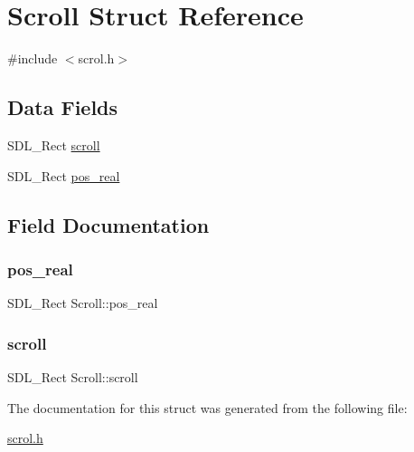 \hypertarget{structScroll}{}\section{Scroll Struct Reference}
\label{structScroll}


{\ttfamily \#include $<$scrol.\+h$>$}

\subsection*{Data Fields}
\begin{DoxyCompactItemize}
\item 
S\+D\+L\+\_\+\+Rect \hyperlink{structScroll_ad00cab44701da688910ad56b377d63f5}{scroll}
\item 
S\+D\+L\+\_\+\+Rect \hyperlink{structScroll_a80e96e14f6ff603064a3c0a6b6677844}{pos\+\_\+real}
\end{DoxyCompactItemize}


\subsection{Field Documentation}
\mbox{\label{structScroll_a80e96e14f6ff603064a3c0a6b6677844}} 
\subsubsection{\texorpdfstring{pos\+\_\+real}{pos\_real}}
{\footnotesize\ttfamily S\+D\+L\+\_\+\+Rect Scroll\+::pos\+\_\+real}

\mbox{\label{structScroll_ad00cab44701da688910ad56b377d63f5}} 
\subsubsection{\texorpdfstring{scroll}{scroll}}
{\footnotesize\ttfamily S\+D\+L\+\_\+\+Rect Scroll\+::scroll}



The documentation for this struct was generated from the following file\+:\begin{DoxyCompactItemize}
\item 
\hyperlink{scrol_8h}{scrol.\+h}\end{DoxyCompactItemize}
